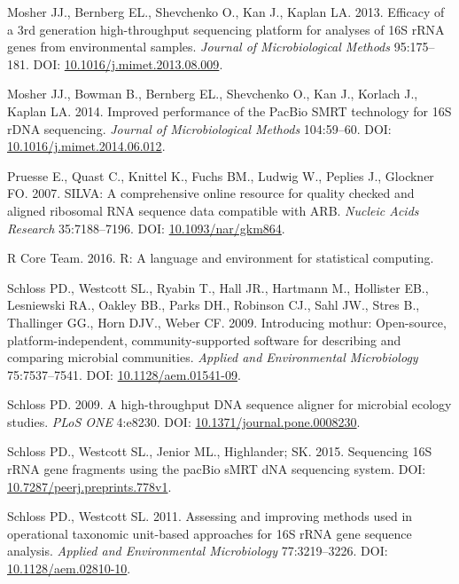 \documentclass[11pt,]{article}
\begin{document}
\hypertarget{ref-Mosher2013}{}
Mosher JJ., Bernberg EL., Shevchenko O., Kan J., Kaplan LA. 2013.
Efficacy of a 3rd generation high-throughput sequencing platform for
analyses of 16S rRNA genes from environmental samples. \emph{Journal of
Microbiological Methods} 95:175--181. DOI:
\href{https://doi.org/10.1016/j.mimet.2013.08.009}{10.1016/j.mimet.2013.08.009}.

\hypertarget{ref-Mosher2014}{}
Mosher JJ., Bowman B., Bernberg EL., Shevchenko O., Kan J., Korlach J.,
Kaplan LA. 2014. Improved performance of the PacBio SMRT technology for
16S rDNA sequencing. \emph{Journal of Microbiological Methods}
104:59--60. DOI:
\href{https://doi.org/10.1016/j.mimet.2014.06.012}{10.1016/j.mimet.2014.06.012}.

\hypertarget{ref-Pruesse2007}{}
Pruesse E., Quast C., Knittel K., Fuchs BM., Ludwig W., Peplies J.,
Glockner FO. 2007. SILVA: A comprehensive online resource for quality
checked and aligned ribosomal RNA sequence data compatible with ARB.
\emph{Nucleic Acids Research} 35:7188--7196. DOI:
\href{https://doi.org/10.1093/nar/gkm864}{10.1093/nar/gkm864}.

\hypertarget{ref-R2016}{}
R Core Team. 2016. R: A language and environment for statistical
computing.

\hypertarget{ref-Schloss2009a}{}
Schloss PD., Westcott SL., Ryabin T., Hall JR., Hartmann M., Hollister
EB., Lesniewski RA., Oakley BB., Parks DH., Robinson CJ., Sahl JW.,
Stres B., Thallinger GG., Horn DJV., Weber CF. 2009. Introducing mothur:
Open-source, platform-independent, community-supported software for
describing and comparing microbial communities. \emph{Applied and
Environmental Microbiology} 75:7537--7541. DOI:
\href{https://doi.org/10.1128/aem.01541-09}{10.1128/aem.01541-09}.

\hypertarget{ref-Schloss2009b}{}
Schloss PD. 2009. A high-throughput DNA sequence aligner for microbial
ecology studies. \emph{PLoS ONE} 4:e8230. DOI:
\href{https://doi.org/10.1371/journal.pone.0008230}{10.1371/journal.pone.0008230}.

\hypertarget{ref-Schloss2015}{}
Schloss PD., Westcott SL., Jenior ML., Highlander; SK. 2015. Sequencing
16S rRNA gene fragments using the pacBio sMRT dNA sequencing system.
DOI:
\href{https://doi.org/10.7287/peerj.preprints.778v1}{10.7287/peerj.preprints.778v1}.

\hypertarget{ref-Schloss2011b}{}
Schloss PD., Westcott SL. 2011. Assessing and improving methods used in
operational taxonomic unit-based approaches for 16S rRNA gene sequence
analysis. \emph{Applied and Environmental Microbiology} 77:3219--3226.
DOI: \href{https://doi.org/10.1128/aem.02810-10}{10.1128/aem.02810-10}.
\end{document}
